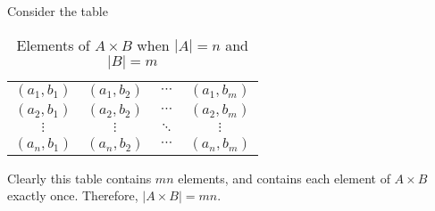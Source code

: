 \documentclass[10pt,]{book}
\theoremstyle{plain}
\theoremstyle{definition}
\theoremstyle{definition}
\theoremstyle{definition}
\theoremstyle{definition}
\numberwithin{equation}{section}
\begin{document}
\begin{exerciselist}
\par

      Consider the table
\leavevmode%
\begin{table}
\centering
\begin{tabular}{cccc}
\((a_1,b_1)\)&\((a_1,b_2)\)&\(\cdots\)&\((a_1,b_m)\)\tabularnewline[0pt]
\((a_2,b_1)\)&\((a_2,b_2)\)&\(\cdots\)&\((a_2,b_m)\)\tabularnewline[0pt]
\(\vdots\)&\(\vdots\)&\(\ddots\)&\(\vdots\)\tabularnewline[0pt]
\((a_n,b_1)\)&\((a_n,b_2)\)&\(\cdots\)&\((a_n,b_m)\)
\end{tabular}
\caption{Elements of \(A\times B\) when \(|A|=n\) and \(|B|=m\)\label{cardmn}}
\end{table}
\par

      Clearly this table contains \(mn\) elements, and contains each element of \(A\times B\) exactly once. Therefore, \(|A\times B|=mn\).
\end{exerciselist}
%
%
%
\appendix
%
\typeout{************************************************}
\typeout{************************************************}
\end{document}
